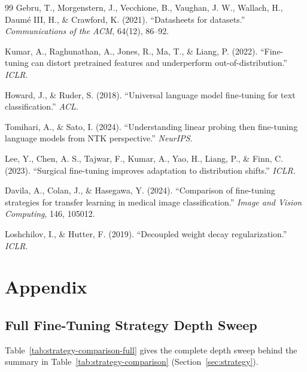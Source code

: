 \documentclass[10pt,twocolumn,letterpaper]{article}
\begin{document}
\begin{thebibliography}{99}
Gebru, T., Morgenstern, J., Vecchione, B., Vaughan, J. W., Wallach, H., Daum\'e III, H., \& Crawford, K. (2021).
``Datasheets for datasets.''
\textit{Communications of the ACM}, 64(12), 86--92.

Kumar, A., Raghunathan, A., Jones, R., Ma, T., \& Liang, P. (2022).
``Fine-tuning can distort pretrained features and underperform out-of-distribution.''
\textit{ICLR}.

Howard, J., \& Ruder, S. (2018).
``Universal language model fine-tuning for text classification.''
\textit{ACL}.

Tomihari, A., \& Sato, I. (2024).
``Understanding linear probing then fine-tuning language models from NTK perspective.''
\textit{NeurIPS}.

Lee, Y., Chen, A. S., Tajwar, F., Kumar, A., Yao, H., Liang, P., \& Finn, C. (2023).
``Surgical fine-tuning improves adaptation to distribution shifts.''
\textit{ICLR}.

Davila, A., Colan, J., \& Hasegawa, Y. (2024).
``Comparison of fine-tuning strategies for transfer learning in medical image classification.''
\textit{Image and Vision Computing}, 146, 105012.

Loshchilov, I., \& Hutter, F. (2019).
``Decoupled weight decay regularization.''
\textit{ICLR}.

\end{thebibliography}

\appendix
\section{Appendix}

\subsection{Full Fine-Tuning Strategy Depth Sweep}
\label{app:strategy-full}

Table~\ref{tab:strategy-comparison-full} gives the complete depth sweep
behind the summary in Table~\ref{tab:strategy-comparison}
(Section~\ref{sec:strategy}).
\end{document}
